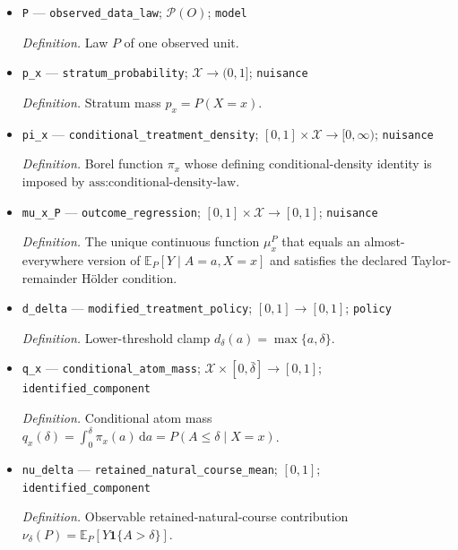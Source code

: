 \documentclass{article}
\begin{document}
\begin{itemize}
  \par\smallskip\noindent\emph{Definition.} The \(i\)-th unit in the sample \(O_1,\ldots,O_n\).
  \item \texttt{P} --- \texttt{observed\_\allowbreak{}data\_\allowbreak{}law}; \(\mathcal P(O)\); \texttt{model}
  \par\smallskip\noindent\emph{Definition.} Law \(P\) of one observed unit.
  \item \texttt{p\_\allowbreak{}x} --- \texttt{stratum\_\allowbreak{}probability}; \(\mathcal X\to(0,1]\); \texttt{nuisance}
  \par\smallskip\noindent\emph{Definition.} Stratum mass \(p_x=P(X=x)\).
  \item \texttt{pi\_\allowbreak{}x} --- \texttt{conditional\_\allowbreak{}treatment\_\allowbreak{}density}; \([0,1]\times\mathcal X\to[0,\infty)\); \texttt{nuisance}
  \par\smallskip\noindent\emph{Definition.} Borel function \(\pi_x\) whose defining conditional-density identity is imposed by \(\text{ass:conditional-density-law}\).
  \item \texttt{mu\_\allowbreak{}x\_\allowbreak{}P} --- \texttt{outcome\_\allowbreak{}regression}; \([0,1]\times\mathcal X\to[0,1]\); \texttt{nuisance}
  \par\smallskip\noindent\emph{Definition.} The unique continuous function \(\mu_x^P\) that equals an almost-everywhere version of \(\mathbb E_P[Y\mid A=a,X=x]\) and satisfies the declared Taylor-remainder Hölder condition.
  \item \texttt{d\_\allowbreak{}delta} --- \texttt{modified\_\allowbreak{}treatment\_\allowbreak{}policy}; \([0,1]\to[0,1]\); \texttt{policy}
  \par\smallskip\noindent\emph{Definition.} Lower-threshold clamp \(d_\delta(a)=\max\{a,\delta\}\).
  \item \texttt{q\_\allowbreak{}x} --- \texttt{conditional\_\allowbreak{}atom\_\allowbreak{}mass}; \(\mathcal X\times[0,\bar\delta]\to[0,1]\); \texttt{identified\_\allowbreak{}component}
  \par\smallskip\noindent\emph{Definition.} Conditional atom mass \(q_x(\delta)=\int_0^\delta\pi_x(a)\,\mathrm da=P(A\leq\delta\mid X=x)\).
  \item \texttt{nu\_\allowbreak{}delta} --- \texttt{retained\_\allowbreak{}natural\_\allowbreak{}course\_\allowbreak{}mean}; \([0,1]\); \texttt{identified\_\allowbreak{}component}
  \par\smallskip\noindent\emph{Definition.} Observable retained-natural-course contribution \(\nu_\delta(P)=\mathbb E_P[Y\mathbf 1\{A>\delta\}]\).

\end{itemize}
\end{document}
